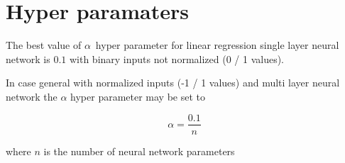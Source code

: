 \documentclass[a4paper,11pt]{article}
\begin{document}
\section{Hyper paramaters}

The best value of  $\alpha$\ hyper parameter for linear regression single layer neural network is $ 0.1 $ with binary inputs not normalized (0 / 1 values).

In case general with normalized inputs (-1 / 1 values) and multi layer neural network the $\alpha$ hyper parameter may be set to

\begin{equation}
	\alpha = \frac{0.1}{n}
\end{equation}

where $ n $ is the number of neural network parameters
\end{document}

